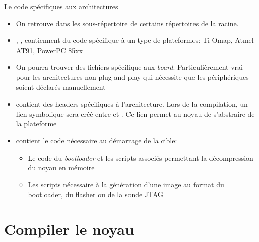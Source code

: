 \begin{frame}[fragile=singleslide]{Le code spécifiques aux architectures}
  \begin{itemize} 
  \item On retrouve dans  les sous-répertoire de  certains
    répertoires de la racine.
  \item  {}, ,   contiennent du
    code spécifique  à un  type de plateformes:  Ti Omap,  Atmel AT91,
    PowerPC 85xx
  \item    On   pourra   trouver    des   fichiers    spécifique   aux
    \emph{board}.  Particulièrement vrai  pour  les architectures  non
    plug-and-play qui nécessite  que les périphériques soient déclarés
    manuellement
  \item   {}   contient   des   headers   spécifiques   à
    l'architecture. Lors  de la  compilation, un lien  symbolique sera
    créé         entre                et
    . Ce  lien permet au noyau de  s'abstraire de la
    plateforme
  \item {}  contient le code  nécessaire au démarrage  de la
    cible:
    \begin{itemize}
    \item  Le  code  du  \emph{bootloader}  et  les  scripts  associés
      permettant la décompression du noyau en mémoire
    \item Les scripts nécessaire à la génération d'une image au format
      du bootloader, du flasher ou de la sonde JTAG
    \end{itemize} 
  \end{itemize} 
\end{frame} 

\section{Compiler le noyau}


